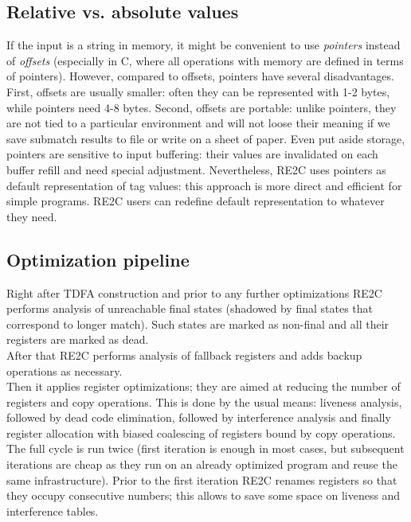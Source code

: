 \documentclass{article}
\theoremstyle{definition}
\begin{document}
\begin{multicols}{2}
\subsection*{Relative vs. absolute values}

If the input is a string in memory, it might be convenient to use \emph{pointers} instead of \emph{offsets}
(especially in C, where all operations with memory are defined in terms of pointers).
However, compared to offsets, pointers have several disadvantages.
First, offsets are usually smaller: often they can be represented with 1-2 bytes, while pointers need 4-8 bytes.
Second, offsets are portable: unlike pointers, they are not tied to a particular environment
and will not loose their meaning if we save submatch results to file or write on a sheet of paper.
Even put aside storage, pointers are sensitive to input buffering:
their values are invalidated on each buffer refill and need special adjustment.
Nevertheless, RE2C uses pointers as default representation of tag values:
this approach is more direct and efficient for simple programs.
RE2C users can redefine default representation to whatever they need.

\subsection*{Optimization pipeline}

Right after TDFA construction and prior to any further optimizations
RE2C performs analysis of unreachable final states
(shadowed by final states that correspond to longer match).
Such states are marked as non-final and all their registers are marked as dead.
\\

After that RE2C performs analysis of fallback registers and adds backup operations as necessary.
\\

Then it applies register optimizations;
they are aimed at reducing the number of registers and copy operations.
This is done by the usual means:
liveness analysis, followed by dead code elimination,
followed by interference analysis and finally register allocation
with biased coalescing of registers bound by copy operations.
The full cycle is run twice (first iteration is enough in most cases,
but subsequent iterations are cheap as they run on an already optimized program and reuse the same infrastructure).
Prior to the first iteration RE2C renames registers so that they occupy consecutive numbers;
this allows to save some space on liveness and interference tables.
\\


\end{multicols}
\end{document}

